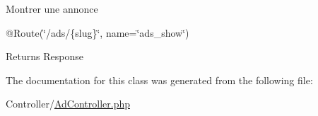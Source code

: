 Montrer une annonce

@\+Route(\char`\"{}/ads/\{slug\}\char`\"{}, name=\char`\"{}ads\+\_\+show\char`\"{})

\begin{DoxyReturn}{Returns}
Response 
\end{DoxyReturn}


The documentation for this class was generated from the following file\+:\begin{DoxyCompactItemize}
\item 
Controller/\mbox{\hyperlink{_ad_controller_8php}{Ad\+Controller.\+php}}\end{DoxyCompactItemize}
